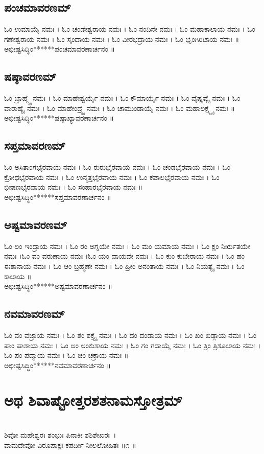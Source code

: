 \subsection{ಪಂಚಮಾವರಣಮ್}
ಓಂ ಉಮಾಯೈ ನಮಃ । ಓಂ  ಚಂಡೇಶ್ವರಾಯ ನಮಃ । ಓಂ  ನಂದಿನೇ ನಮಃ । ಓಂ  ಮಹಾಕಾಲಾಯ ನಮಃ । ಓಂ  ಗಣೇಶ್ವರಾಯ ನಮಃ । ಓಂ  ಸ್ಕಂದಾಯ ನಮಃ । ಓಂ  ವೀರಭದ್ರಾಯ ನಮಃ । ಓಂ  ಭೃಂಗಿರಿಟಾಯ ನಮಃ ॥\\
ಅಭೀಷ್ಟಸಿದ್ಧಿಂ******ಪಂಚಮಾವರಣಾರ್ಚನಂ ॥
\subsection{ಷಷ್ಠಾವರಣಮ್}
ಓಂ ಬ್ರಾಹ್ಮ್ಯೈ ನಮಃ । ಓಂ ಮಾಹೇಶ್ವರ್ಯೈ ನಮಃ । ಓಂ ಕೌಮಾರ್ಯೈ ನಮಃ । ಓಂ ವೈಷ್ಣವ್ಯೈ ನಮಃ । ಓಂ ವಾರಾಹ್ಯೈ ನಮಃ । ಓಂ ಮಾಹೇಂದ್ರ್ಯೈ ನಮಃ । ಓಂ ಚಾಮುಂಡಾಯೈ ನಮಃ । ಓಂ ಮಹಾಲಕ್ಷ್ಮ್ಯೈ ನಮಃ ॥\\
ಅಭೀಷ್ಟಸಿದ್ಧಿಂ******ಷಷ್ಠಾಖ್ಯಾವರಣಾರ್ಚನಂ ॥
\subsection{ಸಪ್ತಮಾವರಣಮ್}
ಓಂ ಅಸಿತಾಂಗಭೈರವಾಯ ನಮಃ । ಓಂ ರುರುಭೈರವಾಯ ನಮಃ । ಓಂ ಚಂಡಭೈರವಾಯ ನಮಃ । ಓಂ ಕ್ರೋಧಭೈರವಾಯ ನಮಃ । ಓಂ ಉನ್ಮತ್ತಭೈರವಾಯ ನಮಃ । ಓಂ ಕಪಾಲಭೈರವಾಯ ನಮಃ । ಓಂ ಭೀಷಣಭೈರವಾಯ ನಮಃ । ಓಂ ಸಂಹಾರಭೈರವಾಯ ನಮಃ ॥\\%
ಅಭೀಷ್ಟಸಿದ್ಧಿಂ******ಸಪ್ತಮಾವರಣಾರ್ಚನಂ ॥
\subsection{ಅಷ್ಟಮಾವರಣಮ್}
ಓಂ ಲಂ ಇಂದ್ರಾಯ ನಮಃ । ಓಂ ರಂ ಅಗ್ನಯೇ ನಮಃ । ಓಂ ಮಂ ಯಮಾಯ ನಮಃ । ಓಂ ಕ್ಷಂ ನಿರ್ಋತಯೇ ನಮಃ ।ಓಂ ವಂ ವರುಣಾಯ ನಮಃ ।ಓಂ ಯಂ ವಾಯವೇ ನಮಃ । ಓಂ ಕುಂ ಕುಬೇರಾಯ ನಮಃ । ಓಂ ಹಂ ಈಶಾನಾಯ ನಮಃ । ಓಂ ಆಂ ಬ್ರಹ್ಮಣೇ ನಮಃ । ಓಂ ಹ್ರೀಂ ಅನಂತಾಯ ನಮಃ । ಓಂ ನಿಯತ್ಯೈ ನಮಃ । ಓಂ ಕಾಲಾಯ ॥\\
ಅಭೀಷ್ಟಸಿದ್ಧಿಂ******ಅಷ್ಟಮಾವರಣಾರ್ಚನಂ ॥
\subsection{ನವಮಾವರಣಮ್}
ಓಂ ವಂ ವಜ್ರಾಯ ನಮಃ । ಓಂ ಶಂ ಶಕ್ತ್ಯೈ ನಮಃ । ಓಂ ದಂ ದಂಡಾಯ ನಮಃ । ಓಂ ಖಂ ಖಡ್ಗಾಯ ನಮಃ । ಓಂ ಪಾಂ ಪಾಶಾಯ ನಮಃ । ಓಂ ಅಂ ಅಂಕುಶಾಯ ನಮಃ । ಓಂ ಗಂ ಗದಾಯೈ ನಮಃ । ಓಂ  ತ್ರಿಂ  ತ್ರಿಶೂಲಾಯ ನಮಃ । ಓಂ ಪಂ ಪದ್ಮಾಯ ನಮಃ । ಓಂ ಚಂ ಚಕ್ರಾಯ ನಮಃ ॥\\
ಅಭೀಷ್ಟಸಿದ್ಧಿಂ******ನವಮಾವರಣಾರ್ಚನಂ ॥
\section{ಅಥ ಶಿವಾಷ್ಟೋತ್ತರಶತನಾಮಸ್ತೋತ್ರಮ್ }
\\
ಶಿವೋ ಮಹೇಶ್ವರಃ ಶಂಭುಃ ಪಿನಾಕೀ ಶಶಿಶೇಖರಃ~।\\
ವಾಮದೇವೋ ವಿರೂಪಾಕ್ಷಃ ಕಪರ್ದೀ ನೀಲಲೋಹಿತಃ ॥೧ ॥

